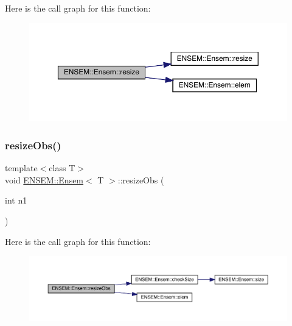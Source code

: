 Here is the call graph for this function\+:
\nopagebreak
\begin{figure}[H]
\begin{center}
\leavevmode
\includegraphics[width=350pt]{d7/d3e/classENSEM_1_1Ensem_acf1e1629e4e10dbd254d81d14271b763_cgraph}
\end{center}
\end{figure}
\mbox{\label{classENSEM_1_1Ensem_a20ee27dffc4b1db635103ce40fb0d5c2}} 
\subsubsection{\texorpdfstring{resizeObs()}{resizeObs()}\hspace{0.1cm}{\footnotesize\ttfamily [1/8]}}
{\footnotesize\ttfamily template$<$class T$>$ \\
void \mbox{\hyperlink{classENSEM_1_1Ensem}{E\+N\+S\+E\+M\+::\+Ensem}}$<$ T $>$\+::resize\+Obs (\begin{DoxyParamCaption}\item[{int}]{n1 }\end{DoxyParamCaption})\hspace{0.3cm}{\ttfamily [inline]}}

Here is the call graph for this function\+:
\nopagebreak
\begin{figure}[H]
\begin{center}
\leavevmode
\includegraphics[width=350pt]{d7/d3e/classENSEM_1_1Ensem_a20ee27dffc4b1db635103ce40fb0d5c2_cgraph}
\end{center}
\end{figure}
\mbox{\label{classENSEM_1_1Ensem_a20ee27dffc4b1db635103ce40fb0d5c2}} 
